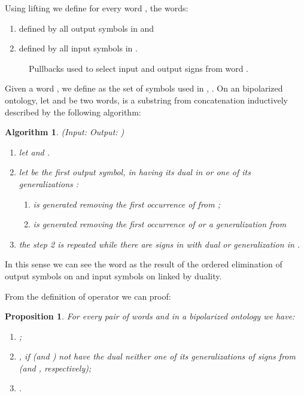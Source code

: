 \documentclass[oribibl]{llncs}
\newtheorem{prop}{Proposition}
\newtheorem{alg}{Algorithm}
\begin{document}
Using lifting we define for every word
, the words:
\begin{enumerate}
  \item  defined by all output symbols in  and
  \item  defined by all input symbols in .
\end{enumerate}
\begin{figure}[h]

\caption{Pullbacks used to select input and output signs from word .}\label{inoutsign}
\end{figure}
Given a word , we define   as the set of symbols used
in ,  . On an bipolarized ontology, let  and  be two words,
 is a substring from concatenation 
inductively described by the following algorithm:

\begin{alg}\label{op:StringGluing}
    (Input:  Output: )
    \begin{enumerate}

    \item let  and .
    \item let  be the first output symbol, in  having its dual   in
     or one of its generalizations :
            \begin{enumerate}
            \item  is generated removing the first occurrence of  from
    ;
            \item  is generated removing the first occurrence of  or a  generalization
    from 
            \end{enumerate}
    \item the step 2 is repeated while there are signs in  with dual or generalization in .
    \end{enumerate}
\end{alg}

In this sense we can see the word  as the result of the ordered elimination of output symbols on  and input symbols on  linked by duality.

From the definition of operator  we can proof:
\begin{prop}
For every pair of words  and  in a bipolarized ontology
 we have:
    \begin{enumerate}
    \item ;
    \item , if  (and ) not have the dual neither one of its generalizations of signs from  (and , respectively);
    \item .
    \end{enumerate}
\end{prop}
\end{document}
